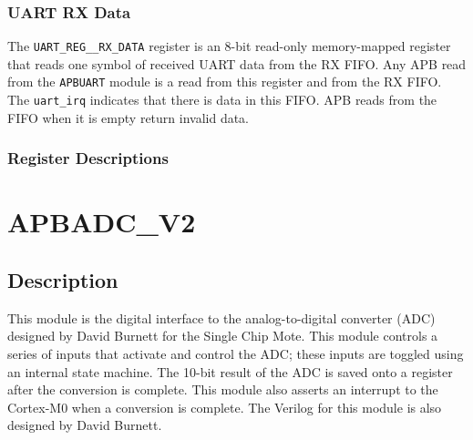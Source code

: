 \subsubsection{UART RX Data}
The \texttt{UART\_REG\_\_RX\_DATA} register is an 8-bit read-only memory-mapped register that reads one symbol of received UART data from the RX FIFO. Any APB read from the \texttt{APBUART} module is a read from this register and from the RX FIFO. The \texttt{uart\_irq} indicates that there is data in this FIFO. APB reads from the FIFO when it is empty return invalid data.

\subsubsection{Register Descriptions}

\section{APBADC\_V2} \label{adc}
\subsection{Description}
This module is the digital interface to the analog-to-digital converter (ADC) designed by David Burnett for the Single Chip Mote. This module controls a series of inputs that activate and control the ADC; these inputs are toggled using an internal state machine. The 10-bit result of the ADC is saved onto a register after the conversion is complete. This module also asserts an interrupt to the Cortex-M0 when a conversion is complete. The Verilog for this module is also designed by David Burnett.

